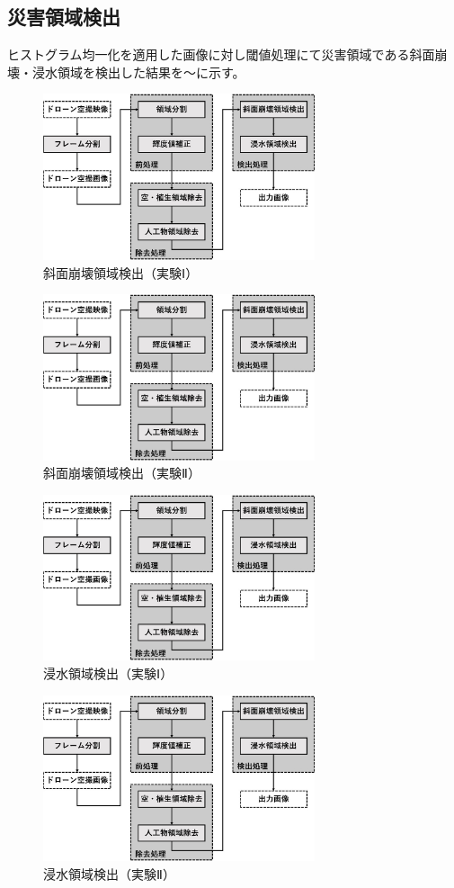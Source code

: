 \documentclass[../Thesis]{subfiles}
\begin{document}
\subsection{災害領域検出}
ヒストグラム均一化を適用した画像に対し閾値処理にて災害領域である斜面崩壊・浸水領域を検出した結果を～に示す。

\begin{figure}[h]
	\centering
	\includegraphics[width=8cm]{img/howto3.jpg}
	\caption{斜面崩壊領域検出（実験Ⅰ）}
	\label{img07}
\end{figure}
\begin{figure}[h]
	\centering
	\includegraphics[width=8cm]{img/howto3.jpg}
	\caption{斜面崩壊領域検出（実験Ⅱ）}
	\label{img08}
\end{figure}

\begin{figure}[h]
	\centering
	\includegraphics[width=8cm]{img/howto3.jpg}
	\caption{浸水領域検出（実験Ⅰ）}
	\label{img09}
\end{figure}
\begin{figure}[h]
	\centering
	\includegraphics[width=8cm]{img/howto3.jpg}
	\caption{浸水領域検出（実験Ⅱ）}
	\label{img10}
\end{figure}
\end{document}
